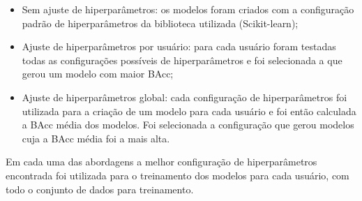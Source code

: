 \begin{itemize}
    \item Sem ajuste de hiperparâmetros: os modelos foram criados com a configuração padrão de hiperparâmetros da biblioteca utilizada (Scikit-learn);
    \item Ajuste de hiperparâmetros por usuário: para cada usuário foram testadas todas as configurações possíveis de hiperparâmetros e foi selecionada a que gerou um modelo com maior BAcc;
    \item Ajuste de hiperparâmetros global: cada configuração de hiperparâmetros foi utilizada para a criação de um modelo para cada usuário e foi então calculada a BAcc média dos modelos. Foi selecionada a configuração que gerou modelos cuja a BAcc média foi a mais alta. 
\end{itemize}

Em cada uma das abordagens a melhor configuração de hiperparâmetros encontrada foi utilizada para o treinamento dos modelos para cada usuário, com todo o conjunto de dados para treinamento.

